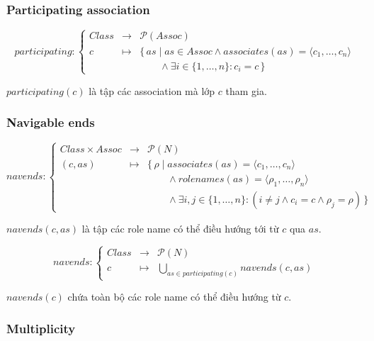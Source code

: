 \documentclass[12pt,a4paper]{article}
\theoremstyle{definition}
\begin{document}
\subsubsection{Participating association}

\[
participating:
\left\{
\begin{array}{rcl}
Class & \to & \mathcal{P}(Assoc)\\
c & \mapsto &
\{\,as\mid
as\in Assoc
\land
associates(as)=\langle c_1,\ldots,c_n\rangle
\\
&&
\qquad\land
\exists i\in\{1,\ldots,n\}:c_i=c
\,\}
\end{array}
\right.
\]

$participating(c)$ là tập các association mà lớp $c$ tham gia.


\subsubsection{Navigable ends}

\[
navends:
\left\{
\begin{array}{rcl}
Class\times Assoc & \to & \mathcal{P}(N)\\
(c,as) & \mapsto &
\{\,\rho\mid
associates(as)=\langle c_1,\ldots,c_n\rangle
\\
&&
\qquad\land
rolenames(as)=\langle \rho_1,\ldots,\rho_n\rangle
\\
&&
\qquad\land
\exists i,j\in\{1,\ldots,n\}:
(i\neq j\land c_i=c\land \rho_j=\rho)
\,\}
\end{array}
\right.
\]

$navends(c,as)$ là tập các role name có thể điều hướng tới từ $c$ qua $as$.

\[
navends:
\left\{
\begin{array}{rcl}
Class & \to & \mathcal{P}(N)\\
c & \mapsto &
\displaystyle
\bigcup_{as\in participating(c)}
navends(c,as)
\end{array}
\right.
\]

$navends(c)$ chứa toàn bộ các role name có thể điều hướng từ $c$.


\subsubsection{Multiplicity}
\end{document}
